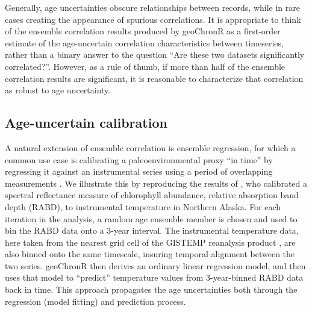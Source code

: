\documentclass[gchron, manuscript]{copernicus}
\begin{document}
Generally, age uncertainties obscure relationships between records,
while in rare cases creating the appearance of spurious correlations. It
is appropriate to think of the ensemble correlation results produced by
geoChronR as a first-order estimate of the age-uncertain correlation
characteristics between timeseries, rather than a binary answer to the
question ``Are these two datasets significantly correlated?''. However,
as a rule of thumb, if more than half of the ensemble correlation
results are significant, it is reasonable to characterize that
correlation as robust to age uncertainty.

\subsection{Age-uncertain calibration}

A natural extension of ensemble correlation is ensemble regression, for
which a common use case is calibrating a paleoenvironmental proxy ``in
time'' by regressing it against an instrumental series using a period of
overlapping measurements \citep{grosjean2009calibration}. We illustrate
this by reproducing the results of \citet{Boldt2015}, who calibrated a
spectral reflectance measure of chlorophyll abundance, relative
absorption band depth (RABD), to instrumental temperature in Northern
Alaska. For each iteration in the analysis, a random age ensemble member
is chosen and used to bin the RABD data onto a 3-year interval. The
instrumental temperature data, here taken from the nearest grid cell of
the GISTEMP reanalysis product \citep{hansen2010global}, are also binned
onto the same timescale, insuring temporal alignment between the two
series. geoChronR then derives an ordinary linear regression model, and
then uses that model to ``predict'' temperature values from
3-year-binned RABD data back in time. This approach propagates the age
uncertainties both through the regression (model fitting) and prediction
process.
\end{document}

